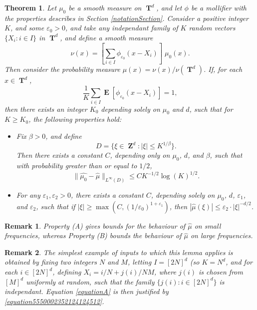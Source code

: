 \documentclass[12pt,reqno]{article}
\numberwithin{equation}{section}
\DeclareMathOperator{\ZZ}{\mathbf{Z}}
\DeclareMathOperator{\TT}{\mathbf{T}}
\newtheorem{theorem}{Theorem}
\newtheorem*{remark}{Remark}
\DeclareMathOperator{\EE}{\mathbf{E}}
\begin{document}
\begin{theorem} \label{randomFourierTheorem}
    Let $\mu_0$ be a smooth measure on $\TT^d$, and let $\phi$ be a mollifier with the properties describes in Section \ref{notationSection}. Consider a positive integer $K$, and some $\varepsilon_0 > 0$, and take any independant family of $K$ random vectors $\{ X_i : i \in I \}$ in $\TT^d$, and define a smooth measure
    \[ \nu(x) = \left[ \sum_{i \in I} \phi_{\varepsilon_0}(x - X_i) \right]\; \mu_0(x). \]
    Then consider the probability measure $\mu(x) = \nu(x) / \nu(\TT^d)$. If, for each $x \in \TT^d$,
    \begin{equation} \label{equationA}
        \frac{1}{K} \sum_{i \in I} \EE\left[ \phi_{\varepsilon_0}(x - X_i) \right] = 1,
    \end{equation}
    then there exists an integer $K_0$ depending solely on $\mu_0$ and $d$, such that for $K \geq K_0$, the following properties hold:
    \begin{itemize}
        \item[(A)] Fix $\beta > 0$, and define
        \[ D = \{ \xi \in \ZZ^d : |\xi| \leq K^{1/\beta} \}. \]
        Then there exists a constant $C$, depending only on $\mu_0$, $d$, and $\beta$, such that with probability greater than or equal to $1/2$,
        \[ \| \widehat{\mu_0} - \widehat{\mu} \|_{L^\infty(D)} \leq C K^{-1/2} \log(K)^{1/2}. \]

        \item[(B)] For any $\varepsilon_1, \varepsilon_2 > 0$, there exists a constant $C$, depending solely on $\mu_0$, $d$, $\varepsilon_1$, and $\varepsilon_2$, such that if $|\xi| \geq \max \left( C, (1/\varepsilon_0)^{1 + \varepsilon_1} \right)$, then $|\widehat{\mu}(\xi)| \leq \varepsilon_2 \cdot |\xi|^{-d/2}$.
    \end{itemize}
\end{theorem}

\begin{remark}
    Property (A) gives bounds for the behaviour of $\widehat{\mu}$ on small frequencies, whereas Property (B) bounds the behaviour of $\widehat{\mu}$ on large frequencies.
\end{remark}

\begin{remark}
    The simplest example of inputs to which this lemma applies is obtained by fixing two integers $N$ and $M$, letting $I = [2N]^d$ (so $K = N^d$, and for each $i \in [2N]^d$, defining $X_i = i/N + j(i)/NM$, where $j(i)$ is chosen from $[M]^d$ uniformly at random, such that the family $\{ j(i) : i \in [2N]^d \}$ is independant. Equation \eqref{equationA} is then justified by \eqref{equation5550002352124124512}.
\end{remark}
\end{document}
